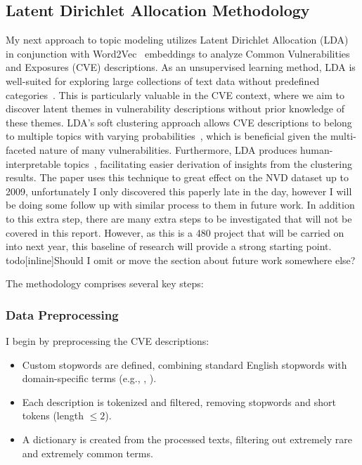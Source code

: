 \documentclass[12pt]{article}
\begin{document}
\subsection{Latent Dirichlet Allocation Methodology}

My next approach to topic modeling utilizes Latent Dirichlet Allocation (LDA)~\cite{lda_origin} in
conjunction with Word2Vec~\cite{word2vec} embeddings to analyze Common Vulnerabilities and Exposures
(CVE) descriptions. As an unsupervised learning method, LDA is well-suited for exploring large
collections of text data without predefined categories~\cite{lda_origin, latent_handbook}. This is
particularly valuable in the CVE context, where we aim to discover latent themes in vulnerability
descriptions without prior knowledge of these themes. LDA's soft clustering approach allows CVE
descriptions to belong to multiple topics with varying probabilities~\cite{latent_handbook}, which is beneficial given
the multi-faceted nature of many vulnerabilities. Furthermore, LDA produces human-interpretable
topics~\cite{lda_origin}, facilitating easier derivation of insights from the clustering results.
The paper \cite{cve_topic_modelling} uses this technique to great effect on the NVD dataset up
to 2009, unfortunately I only discovered this paperly late in the day, however I will be doing some
follow up with similar process to them in future work. In addition to this extra step, there are
many extra steps to be investigated that will not be covered in this report. However, as this is a
480 project that will be carried on into next year, this baseline of research will provide a strong
starting point.
todo[inline]{Should I omit or move the section about future work somewhere else?}

The methodology comprises several key steps:

\subsubsection{Data Preprocessing} I begin by preprocessing the CVE descriptions:

\begin{itemize}

	\item Custom stopwords are defined, combining standard English stopwords with domain-specific
	      terms (e.g., , ).

	\item Each description is tokenized and filtered, removing stopwords and short tokens (length
	      $\leq 2$).

	\item A dictionary is created from the processed texts, filtering out extremely rare and
	      extremely common terms.

\end{itemize}
\end{document}
